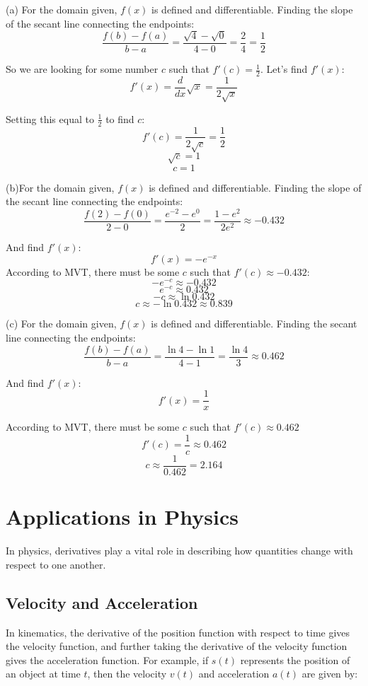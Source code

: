\begin{Answer}
[ref=MVT2]
(a) For the domain given, $f(x)$ is defined and differentiable. Finding the 
slope of the secant line connecting the endpoints:
$$\frac{f(b)-f(a)}{b-a}=\frac{\sqrt{4}-\sqrt{0}}{4-0}=\frac{2}{4}=\frac{1}{2}$$

So we are looking for some number $c$ such that $f'(c) = \frac{1}{2}$. Let's 
find $f'(x)$:
$$f'(x) = \frac{d}{dx}\sqrt{x}=\frac{1}{2\sqrt{x}}$$

Setting this equal to $\frac{1}{2}$ to find $c$:
$$f'(c) = \frac{1}{2\sqrt{c}}=\frac{1}{2}$$
$$\sqrt{c}=1$$
$$c=1$$

(b)For the domain given, $f(x)$ is defined and differentiable. Finding the 
slope of the secant line connecting the endpoints:
$$\frac{f(2) - f(0)}{2 - 0}=\frac{e^{-2} - e^{0}}{2}=\frac{1 - e^{2}}{2e^{2}} 
\approx -0.432$$

And find $f'(x)$:
$$f'(x) = -e^{-x}$$
According to MVT, there must be some $c$ such that $f'(c) \approx-0.432$:
$$-e^{-c} \approx -0.432$$
$$e^{-c}\approx 0.432$$
$$-c \approx \ln{0.432}$$
$$c \approx -\ln{0.432} \approx 0.839$$

(c) For the domain given, $f(x)$ is defined and differentiable. Finding the 
secant line connecting the endpoints:
$$\frac{f(b) - f(a)}{b - a}=\frac{\ln{4} - \ln{1}}{4 - 1} = \frac{\ln{4}}{3} 
\approx 0.462$$

And find $f'(x)$:
$$f'(x) = \frac{1}{x}$$

According to MVT, there must be some $c$ such that $f'(c) \approx 0.462$
$$f'(c) = \frac{1}{c} \approx 0.462$$
$$c \approx \frac{1}{0.462} = 2.164$$
\end{Answer}



\section{Applications in Physics}

In physics, derivatives play a vital role in describing how quantities change 
with respect to one another.

\subsection{Velocity and Acceleration}

In kinematics, the derivative of the position function with respect to time 
gives the velocity function, and further taking the derivative of the velocity 
function gives the acceleration function. For example, if $s(t)$ represents 
the position of an object at time $t$, then the velocity $v(t)$ and 
acceleration $a(t)$ are given by:

